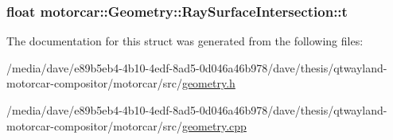 \hypertarget{structmotorcar_1_1Geometry_1_1RaySurfaceIntersection_af32545772aead85519b20869fbc34284}{
\subsubsection[{t}]{\setlength{\rightskip}{0pt plus 5cm}float motorcar\-::\-Geometry\-::\-Ray\-Surface\-Intersection\-::t}}\label{structmotorcar_1_1Geometry_1_1RaySurfaceIntersection_af32545772aead85519b20869fbc34284}


The documentation for this struct was generated from the following files\-:\begin{DoxyCompactItemize}
\item 
/media/dave/e89b5eb4-\/4b10-\/4edf-\/8ad5-\/0d046a46b978/dave/thesis/qtwayland-\/motorcar-\/compositor/motorcar/src/\hyperlink{geometry_8h}{geometry.\-h}\item 
/media/dave/e89b5eb4-\/4b10-\/4edf-\/8ad5-\/0d046a46b978/dave/thesis/qtwayland-\/motorcar-\/compositor/motorcar/src/\hyperlink{geometry_8cpp}{geometry.\-cpp}\end{DoxyCompactItemize}
